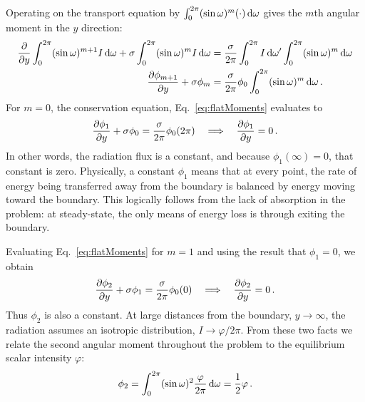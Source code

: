 Operating on the transport equation by $\int_{0}^{2\pi} (\sin\omega)^m (\cdot)
\mathop{}\!\mathrm{d}\omega$ gives the $m$th angular moment in the $y$ direction:
\begin{align} \nonumber
  \frac{\partial }{\partial y} \int_{0}^{2\pi} (\sin\omega)^{m+1} I \mathop{}\!\mathrm{d}\omega
  + \sigma \int_{0}^{2\pi} (\sin\omega)^{m} I \mathop{}\!\mathrm{d}\omega
  &= \frac{\sigma}{2\pi} \int_{0}^{2\pi} I \mathop{}\!\mathrm{d} \omega'
  \int_{0}^{2\pi} (\sin\omega)^{m} \mathop{}\!\mathrm{d}\omega
  \\ \label{eq:flatMoments}
  \frac{\partial \phi_{m+1}}{\partial y}
  + \sigma \phi_{m}
  &= \frac{\sigma}{2\pi} \phi_{0}
  \int_{0}^{2\pi} (\sin\omega)^{m} \mathop{}\!\mathrm{d}\omega\,.
\end{align}
For $m=0$, the conservation equation, Eq.~\eqref{eq:flatMoments} evaluates to
\begin{equation*}
  \frac{\partial \phi_{1}}{\partial y}
  + \sigma \phi_{0}
  = \frac{\sigma}{2\pi} \phi_{0} (2\pi)
  \quad \Longrightarrow \quad
  \frac{\partial \phi_{1}}{\partial y} = 0\,.
\end{equation*}
In other words, the radiation flux is a constant, and because $\phi_1(\infty)=0$,
that constant is zero. Physically, a constant $\phi_1$ means that at every
point, the rate of energy being transferred away from the boundary is balanced
by energy moving toward the boundary. This logically follows from the lack of
absorption in the problem: at steady-state, the only means of energy loss is
through exiting the boundary.

Evaluating Eq.~\eqref{eq:flatMoments} for $m=1$ and using the result that
$\phi_{1}=0$, we obtain
\begin{equation*}
  \frac{\partial \phi_{2}}{\partial y}
  + \sigma \phi_{1}
  = \frac{\sigma}{2\pi} \phi_{0} (0)
  \quad \Longrightarrow \quad
  \frac{\partial \phi_{2}}{\partial y} = 0\,.
\end{equation*}
Thus $\phi_{2}$ is also a constant. At large distances from the boundary,
$y\to\infty$, the radiation assumes an isotropic distribution,
$I\to\varphi/2\pi$. From these two facts we relate the second angular moment
throughout the problem to the equilibrium scalar intensity $\varphi$:
\begin{equation*}
  \phi_{2} = \int_{0}^{2\pi} (\sin\omega)^2 \frac{\varphi}{2\pi} \mathop{}\!\mathrm{d}\omega
  = \frac{1}{2} \varphi\,.
\end{equation*}

